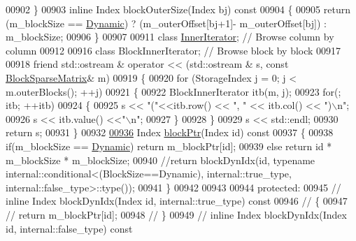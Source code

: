 \begin{DoxyCode}
00902     \}
00903     \textcolor{keyword}{inline} Index blockOuterSize(Index bj)\textcolor{keyword}{ const}
00904 \textcolor{keyword}{    }\{
00905       \textcolor{keywordflow}{return} (m\_blockSize == \hyperlink{namespace_eigen_ad81fa7195215a0ce30017dfac309f0b2}{Dynamic}) ? (m\_outerOffset[bj+1]- m\_outerOffset[bj]) : m\_blockSize;
00906     \}
00907 
00911     \textcolor{keyword}{class }\hyperlink{class_eigen_1_1_inner_iterator}{InnerIterator}; \textcolor{comment}{// Browse column by column}
00912 
00916     \textcolor{keyword}{class }BlockInnerIterator; \textcolor{comment}{// Browse block by block}
00917 
00918     \textcolor{keyword}{friend} std::ostream & operator << (std::ostream & s, \textcolor{keyword}{const} \hyperlink{group___sparse_core___module_class_eigen_1_1_block_sparse_matrix}{BlockSparseMatrix}& m)
00919     \{
00920       \textcolor{keywordflow}{for} (StorageIndex j = 0; j < m.outerBlocks(); ++j)
00921       \{
00922         BlockInnerIterator itb(m, j);
00923         \textcolor{keywordflow}{for}(; itb; ++itb)
00924         \{
00925           s << \textcolor{stringliteral}{"("}<<itb.row() << \textcolor{stringliteral}{", "} << itb.col() << \textcolor{stringliteral}{")\(\backslash\)n"};
00926           s << itb.value() <<\textcolor{stringliteral}{"\(\backslash\)n"};
00927         \}
00928       \}
00929       s << std::endl;
00930       \textcolor{keywordflow}{return} s;
00931     \}
00932 
\hyperlink{group___sparse_core___module_a16b8ee2d4e92d774bf286e6575fd8369}{00936}     Index \hyperlink{group___sparse_core___module_a16b8ee2d4e92d774bf286e6575fd8369}{blockPtr}(Index \textcolor{keywordtype}{id})\textcolor{keyword}{ const}
00937 \textcolor{keyword}{    }\{
00938       \textcolor{keywordflow}{if}(m\_blockSize == \hyperlink{namespace_eigen_ad81fa7195215a0ce30017dfac309f0b2}{Dynamic}) \textcolor{keywordflow}{return} m\_blockPtr[id];
00939       \textcolor{keywordflow}{else} \textcolor{keywordflow}{return} \textcolor{keywordtype}{id} * m\_blockSize * m\_blockSize;
00940       \textcolor{comment}{//return blockDynIdx(id, typename internal::conditional<(BlockSize==Dynamic), internal::true\_type,
       internal::false\_type>::type());}
00941     \}
00942 
00943 
00944   \textcolor{keyword}{protected}:
00945 \textcolor{comment}{//    inline Index blockDynIdx(Index id, internal::true\_type) const}
00946 \textcolor{comment}{//    \{}
00947 \textcolor{comment}{//      return m\_blockPtr[id];}
00948 \textcolor{comment}{//    \}}
00949 \textcolor{comment}{//    inline Index blockDynIdx(Index id, internal::false\_type) const}

\end{DoxyCode}
